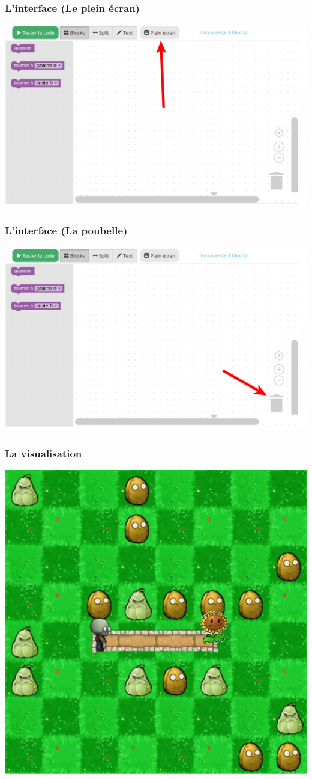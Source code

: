 \documentclass{beamer}
\begin{document}
\begin{frame}
	\frametitle{L'interface (Le plein écran)}

	\includegraphics[width=\linewidth]{interface_fullscreen.png}
\end{frame}

\begin{frame}
	\frametitle{L'interface (La poubelle)}

	\includegraphics[width=\linewidth]{interface_trash.png}
\end{frame}

\begin{frame}
	\frametitle{La visualisation}

	\centering
	\includegraphics[width=0.65\linewidth]{visualisation_pvz.png}
\end{frame}
\end{document}
